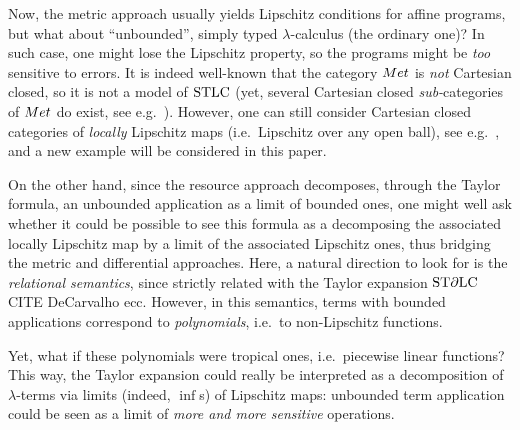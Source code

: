 Now, the metric approach usually yields Lipschitz conditions for affine programs, but what about ``unbounded'', simply typed $\lambda$-calculus (the ordinary one)?
In such case, one might lose the Lipschitz property, so the programs might be \emph{too} sensitive to errors. 
It is indeed well-known that the category $\Met$ is \emph{not} Cartesian closed, so it is not a model of $\mathrm{STLC}$ (yet, several Cartesian closed \emph{sub-}categories of $\Met$ do exist, see e.g.~\cite{Clementino2006, PistoneFSCD2022}).
However, one can still consider Cartesian closed categories of \emph{locally} Lipschitz maps  (i.e.~Lipschitz over any open ball), see e.g.\ \cite{Ehrhard2011, PistoneLICS}, and a new example will be considered in this paper.

On the other hand, since the resource approach decomposes, through the Taylor formula, an unbounded application as a limit of bounded ones, one might well ask whether it could be possible to see this formula as a decomposing the associated locally Lipschitz map by a limit of the associated Lipschitz ones, thus bridging the metric and differential approaches.  
Here, a natural direction to look for is the \emph{relational semantics}, since strictly related with the Taylor expansion $\mathrm{ST}\partial\mathrm{LC}$ {\color{red}CITE DeCarvalho ecc}. 
However, in this semantics, terms with bounded applications correspond to \emph{polynomials}, i.e.~to non-Lipschitz functions.
 
Yet, what if these polynomials were tropical ones, i.e.~piecewise linear functions? This way, the Taylor expansion could really be interpreted as a decomposition of $\lambda$-terms via limits (indeed, $\inf$s) of Lipschitz maps: unbounded term application could be seen as a limit of \emph{more and more sensitive} operations. 

%
%

